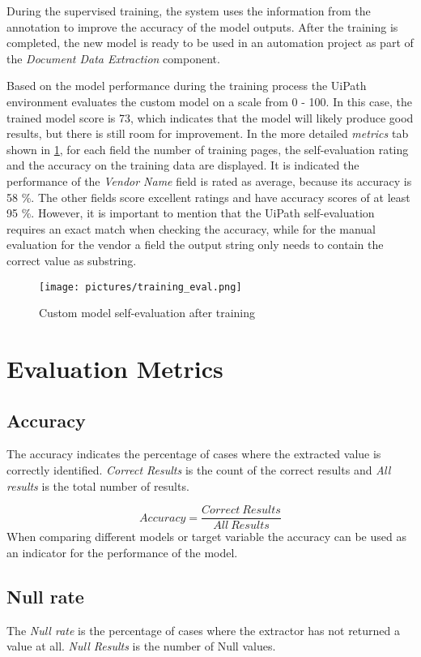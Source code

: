 During the supervised training, the system uses the information from the annotation to improve the accuracy of the model outputs. After the training is completed, the new model is ready to be used in an automation project as part of the \textit{Document Data Extraction} component. 

Based on the model performance during the training process the UiPath environment evaluates the custom model on a scale from 0 - 100. In this case, the trained model score is 73, which indicates that the model will likely produce good results, but there is still room for improvement. In the more detailed \textit{metrics} tab shown in \cref{fig:train-eval}, for each field the number of training pages, the self-evaluation rating and the accuracy on the training data are displayed. 
It is indicated the performance of the \textit{Vendor Name} field is rated as average, because its accuracy is 58 \%. The other fields score excellent ratings and have accuracy scores of at least 95 \%. However, it is important to mention that the UiPath self-evaluation requires an exact match when checking the accuracy, while for the manual evaluation for the vendor a field the output string only needs to contain the correct value as substring.

\begin{figure}[ht]
    \centering
    \texttt{[image: pictures/training\_eval.png]}
    \caption{Custom model self-evaluation after training}
    \label{fig:train-eval}
\end{figure}

\newpage
\section{Evaluation Metrics}
\subsection{Accuracy}
The accuracy indicates the percentage of cases where the extracted value is correctly identified. \textit{Correct Results} is the count of the correct results and \textit{All results} is the total number of results.

\[ Accuracy = \frac{Correct \ Results}{All \ Results}\]
When comparing different models or target variable the accuracy can be used as an indicator for the performance of the model.
\subsection{Null rate}
The \textit{Null rate} is the percentage of cases where the extractor has not returned a value at all. \textit{Null Results} is the number of Null values.

